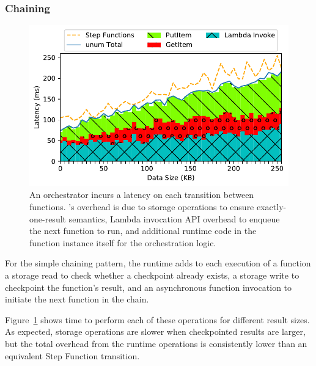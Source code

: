 \subsubsection{Chaining}\label{sec:eval:chain}

\begin{figure}[t]
  \centering
  \includegraphics[width=\columnwidth]{figures/TotalAdditionalLatencyNBreakdown.pdf}
  \caption{An orchestrator incurs a latency on each transition between
functions. \name{}'s overhead is due to storage operations to ensure
exactly-one-result semantics, Lambda invocation API overhead to enqueue the
next function to run, and additional \name{} runtime code in the function
instance itself for the orchestration logic.}
  \label{fig:single-transition-latency-breakdown}
\end{figure}

For the simple chaining pattern, the \name{} runtime adds to each execution of
a function a storage read to check whether a checkpoint already exists, a
storage write to checkpoint the function's result, and an asynchronous
function invocation to initiate the next function in the chain.

Figure~\ref{fig:single-transition-latency-breakdown} shows time to perform each
of these operations for different result sizes. As expected, storage operations
are slower when checkpointed results are larger, but the total overhead from the
\name{} runtime operations is consistently lower than an equivalent Step
Function transition.


